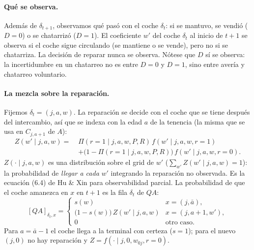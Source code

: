 \documentclass{article}
\begin{document}
\paragraph{Qué se observa.} Además de $\delta_{t+1}$, observamos qué pasó con el coche $\delta_t$: si se mantuvo, se vendió ($D=0$) o se chatarrizó ($D=1$). El coeficiente $w'$ del coche $\delta_t$ al inicio de $t+1$ se observa si el coche sigue circulando (se mantiene o se vende), pero no si se chatarriza. La decisión de reparar nunca se observa. Nótese que $D$ sí se observa: la incertidumbre en un chatarreo no es entre $D=0$ y $D=1$, sino entre avería y chatarreo voluntario.

\paragraph{La mezcla sobre la reparación.} Fijemos $\delta_t=(j,a,w)$. La reparación se decide con el coche que se tiene después del intercambio, así que se indexa con la edad $a$ de la tenencia (la misma que se usa en $C_{j,a+1}$ de $A$):
$$\begin{aligned}
    Z(w'\mid j,a,w)=\;&\Pi(r=1\mid j,a,w, P, R)\,f(w'\mid j,a,w,r=1)\\
    &+\big(1-\Pi(r=1\mid j,a,w, P, R)\big)\,f(w'\mid j,a,w,r=0).
\end{aligned}$$
$Z(\cdot\mid j,a,w)$ es una distribución sobre el grid de $w'$ ($\sum_{w'}Z(w'\mid j,a,w)=1$): la probabilidad de \emph{llegar a cada} $w'$ integrando la reparación no observada. Es la ecuación (6.4) de Hu \& Xin para observabilidad parcial. La probabilidad de que el coche amanezca en $x$ en $t+1$ es la fila $\delta_t$ de $QA$:
$$[QA]_{\delta_t,x}=\begin{cases}
s(w) & x=(j,\bar{a}),\\[2pt]
\big(1-s(w)\big)\,Z(w'\mid j,a,w) & x=(j,a+1,w'),\\[2pt]
0 & \text{otro caso}.
\end{cases}$$
Para $a=\bar{a}-1$ el coche llega a la terminal con certeza ($s=1$); para el nuevo $(j,0)$ no hay reparación y $Z=f(\cdot\mid j,0,w_{0j},r=0)$.
\end{document}

